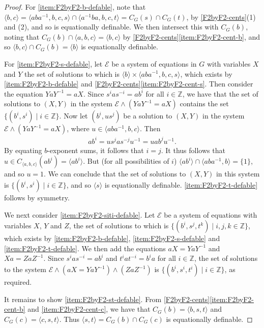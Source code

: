 \documentclass[11pt]{amsart}
\theoremstyle{definition}
\numberwithin{theorem}{section}
\newcommand{\Z}{\mathbb{Z}}
\begin{document}
	\begin{proof}
		For \eqref{item:F2byF2-b-defable}, note that \(\langle b, c \rangle
		= \langle aba^{-1}, b,c, s \rangle \cap \langle a^{-1}ba, b,c, t \rangle
		= C_G(s) \cap C_G(t)\), by \cref{F2byF2-cents}(1) and (2), and so is
		equationally definable. We then intersect this with \(C_G(b)\), noting
		that \(C_G(b) \cap \langle a, b, c \rangle = \langle b, c\rangle\) by
		\cref{F2byF2-cents}\eqref{item:F2byF2-cent-b},
		and so \(\langle b, c \rangle \cap C_G(b) = \langle b \rangle\)
		is equationally definable.

		For \eqref{item:F2byF2-s-defable}, let \(\mathcal E\) be a system of
		equations in \(G\) with variables \(X\) and \(Y\) the set of solutions
		to which is \(\langle b \rangle \times \langle aba^{-1}, b, c, s
		\rangle\), which exists by \eqref{item:F2byF2-b-defable} and
		\cref{F2byF2-cents}\eqref{item:F2byF2-cent-s}. Then consider the
		equation \(Ya Y^{-1} = a X\). Since
		\(s^i a s^{-i} = ab^i\) for all \(i \in \Z\), we have that the set of
		solutions to \((X, Y)\) in the system \(\mathcal E \wedge (Ya Y^{-1} =
		aX)\) contains the set \(\{(b^i, s^i) \mid i \in \Z\}\). Now let \((b^i,
		us^j)\) be a solution to \((X, Y)\) in the system \(\mathcal E \wedge
		(YaY^{-1} = aX)\), where \(u \in \langle aba^{-1}, b, c \rangle\). Then
		\begin{align*}
				ab^i = us^j a s^{-j} u^{-1} =
				uab^j u^{-1}.
		\end{align*}
		By equating \(b\)-exponent sums, it follows that \(i = j\). It thus
		follows that \(u \in C_{\langle a, b, c \rangle}(ab^i) = \langle ab^i
		\rangle\). But (for all possibilities of \(i\)) \(\langle ab^i \rangle
		\cap \langle aba^{-1}, b \rangle  =\{1\}\), and so \(u = 1\). We can
		conclude that the set of solutions to \((X, Y)\) in this system is
		\(\{(b^i, s^i) \mid i \in \Z\}\), and so \(\langle s \rangle\) is
		equationally definable.  \eqref{item:F2byF2-t-defable} follows by
		symmetry.

		We next consider \eqref{item:F2byF2-siti-defable}. Let \(\mathcal E\)
		be a system of equations with variables \(X\), \(Y\) and \(Z\), the set
		of solutions to which is \(\{(b^i, s^j, t^k) \mid i, j, k \in \Z\}\),
		which exists by \eqref{item:F2byF2-b-defable},
		\eqref{item:F2byF2-s-defable} and \eqref{item:F2byF2-t-defable}. We
		then add the equations \(aX = YaY^{-1}\) and \(Xa = Z a Z^{-1}\). Since
		\(s^i as^{-i} = ab^i\) and \(t^i a t^{-i} = b^{i} a\) for all \(i \in
		\Z\), the set of solutions to the system \(\mathcal E \wedge (aX =
		YaY^{-1}) \wedge (Z a Z^{-1})\) is \(\{(b^i, s^i, t^{i}) \mid i \in
		\Z\}\), as required.

		It remains to show \eqref{item:F2byF2-st-defable}. From
		\cref{F2byF2-cents}\eqref{item:F2byF2-cent-b} and
		\eqref{item:F2byF2-cent-c}, we have that \(C_G(b) = \langle b, s, t
		\rangle\) and \(C_G(c) = \langle c, s, t \rangle\). Thus
		\(\langle s, t \rangle = C_G(b) \cap C_G(c)\) is equationally
		definable.
	\end{proof}
\end{document}
